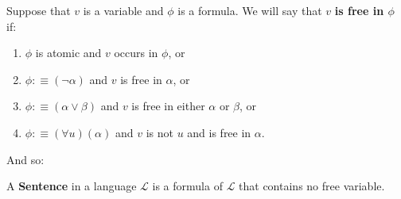 \documentclass[9pt,a4paper, twocolumn]{article}
\newcommand{\curveL}{\mathcal{L}}
\begin{document}
        \begin{define}
            Suppose that $v$ is a variable and $\phi$ is a formula. We will say that $v$ \textbf{is free in $\phi$} if:
            \begin{enumerate}
                \item $\phi$ is atomic and $v$ occurs in $\phi$, or
                \item $\phi:\equiv (\neg\alpha)$ and $v$ is free in $\alpha$, or
                \item $\phi:\equiv (\alpha\lor\beta)$ and $v$ is free in either $\alpha$ or $\beta$, or
                \item $\phi:\equiv (\forall u)(\alpha)$ and $v$ is not $u$ and is free in $\alpha$.
            \end{enumerate}
        \end{define}
        And so:
        \begin{define}
            A \textbf{Sentence} in a language $\curveL$ is a formula of $\curveL$ that contains no free variable.
        \end{define}
\end{document}
